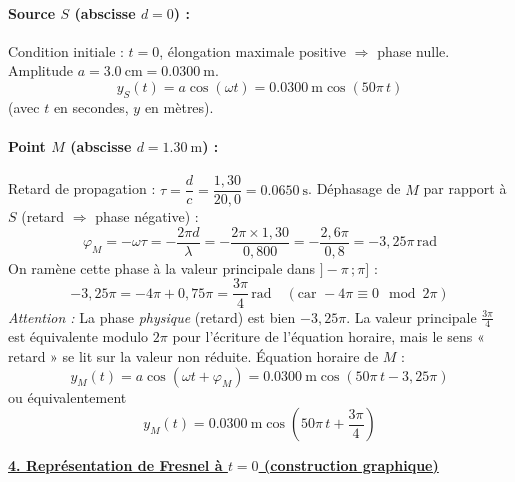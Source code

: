 \documentclass[11pt]{article}
\begin{document}
\begin{exoresolu}
\paragraph{Source $S$ (abscisse $d=0$) :}
Condition initiale : $t=0$, élongation maximale positive $\Rightarrow$ phase nulle. Amplitude $a = \SI{3,0}{\centi\meter} = \SI{0,0300}{\meter}$.
\[ y_S(t) = a \cos(\omega t) = \SI{0,0300}{\meter} \cos(50\pi \, t) \]
(avec $t$ en secondes, $y$ en mètres).

\paragraph{Point $M$ (abscisse $d = \SI{1,30}{\meter}$) :}
Retard de propagation : $\tau = \dfrac{d}{c} = \dfrac{1,30}{20,0} = \SI{0,0650}{\second}$.
Déphasage de $M$ par rapport à $S$ (retard $\Rightarrow$ phase négative) :
\[ \varphi_M = -\omega \tau = -\frac{2\pi d}{\lambda} = -\frac{2\pi \times 1,30}{0,800} = -\frac{2,6\pi}{0,8} = -3,25\pi \,\text{rad} \]
On ramène cette phase à la valeur principale dans $]-\pi\,;\pi]$ :
\[ -3,25\pi = -4\pi + 0,75\pi = \frac{3\pi}{4} \,\text{rad} \quad (\text{car } -4\pi \equiv 0 \mod 2\pi) \]
\emph{Attention :} La phase \emph{physique} (retard) est bien $-3,25\pi$. La valeur principale $\frac{3\pi}{4}$ est équivalente modulo $2\pi$ pour l'écriture de l'équation horaire, mais le sens « retard » se lit sur la valeur non réduite.
Équation horaire de $M$ :
\[ y_M(t) = a \cos(\omega t + \varphi_M) = \SI{0,0300}{\meter} \cos\left(50\pi \, t - 3,25\pi\right) \]
ou équivalentement
\[ \boxed{y_M(t) = \SI{0,0300}{\meter} \cos\left(50\pi \, t + \frac{3\pi}{4}\right)} \]

\underline{\textbf{4. Représentation de Fresnel à $t=0$ (construction graphique)}}


\end{exoresolu}
\end{document}
